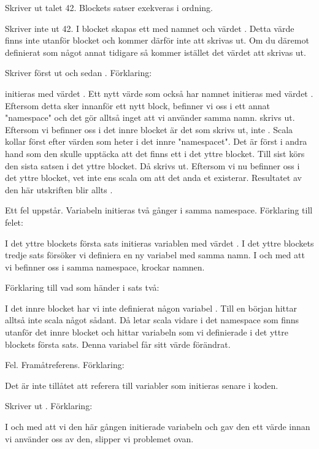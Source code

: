 \Subtask Skriver ut talet 42. Blockets satser exekveras i ordning. 

\Subtask Skriver inte ut 42. I blocket skapas ett  med namnet  och värdet . Detta värde finns inte utanför blocket och kommer därför inte att skrivas ut. Om du däremot definierat  som något annat tidigare så kommer istället det värdet att skrivas ut.

\Subtask Skriver först ut  och sedan . Förklaring:

 initieras med värdet . Ett nytt värde som också har namnet  initieras med värdet . Eftersom detta sker innanför ett nytt block, befinner vi oss i ett annat "namespace" och det gör alltså inget att vi använder samma namn.  skrivs ut. Eftersom vi befinner oss i det innre blocket är det  som skrivs ut, inte . Scala kollar först efter värden som heter  i det innre "namespacet". Det är först i andra hand som den skulle upptäcka att det finns ett  i det yttre blocket. Till sist körs den sista satsen i det yttre blocket. Då skrivs  ut. Eftersom vi nu befinner oss i det yttre blocket, vet inte ens scala om att det anda et existerar. Resultatet av den här utskriften blir allts .

\Subtask Ett fel uppstår. Variabeln  initieras två gånger i samma namespace. Förklaring till felet:

I det yttre blockets första sats initieras variablen  med värdet . I det yttre blockets tredje sats försöker vi definiera en ny variabel med samma namn. I och med att vi befinner oss i samma namespace, krockar namnen.

Förklaring till vad som händer i sats två:

I det innre blocket har vi inte definierat någon variabel . Till en början hittar alltså inte scala något sådant. Då letar scala vidare i det namespace som finns utanför det innre blocket och hittar variabeln som vi definierade i det yttre blockets första sats. Denna variabel får sitt värde förändrat.

\Subtask Fel. Framåtreferens. Förklaring:

Det är inte tillåtet att referera till variabler som initieras senare i koden.

\Subtask Skriver ut . Förklaring:

I och med att vi den här gången initierade variabeln  och gav den ett värde innan vi använder oss av den, slipper vi problemet ovan.

